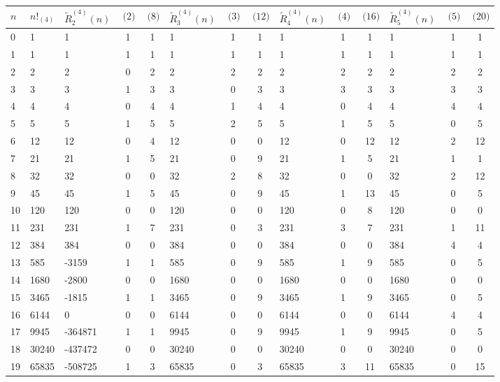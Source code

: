 \documentclass[12pt,reqno]{article}
\numberwithin{sfootnote}{section}
\newcommand{\tabletopstrut}[0]{\rule{0pt}{3ex}}
\numberwithin{equation}{section}
\theoremstyle{DefaultTheoremStyle}
\theoremstyle{definition}
\newcommand{\MultiFactorial}[2]{\ensuremath{#1!_{\left(#2\right)}}}
\begin{document}
\begin{sidewaystable} 
\centering 
\smaller 

\begin{tabular}{|l|l|lcc|lcc|lcc|lcc|} \hline 
\hline\tabletopstrut 
$n$ & $\MultiFactorial{n}{4}$ & 
$\widetilde{R}_2^{(4)}(n)$ & $\pod{2}$ & $\pod{8}$ &
$\widetilde{R}_3^{(4)}(n)$ & $\pod{3}$ & $\pod{12}$ &
$\widetilde{R}_4^{(4)}(n)$ & $\pod{4}$ & $\pod{16}$ &
$\widetilde{R}_5^{(4)}(n)$ & $\pod{5}$ & $\pod{20}$ \\ \hline 
 0 & 1 & 1 & 1 & 1 & 1 & 1 & 1 & 1 & 1 & 1 & 1 & 1 & 1 \\
 1 & 1 & 1 & 1 & 1 & 1 & 1 & 1 & 1 & 1 & 1 & 1 & 1 & 1 \\
 2 & 2 & 2 & 0 & 2 & 2 & 2 & 2 & 2 & 2 & 2 & 2 & 2 & 2 \\
 3 & 3 & 3 & 1 & 3 & 3 & 0 & 3 & 3 & 3 & 3 & 3 & 3 & 3 \\
 4 & 4 & 4 & 0 & 4 & 4 & 1 & 4 & 4 & 0 & 4 & 4 & 4 & 4 \\
 5 & 5 & 5 & 1 & 5 & 5 & 2 & 5 & 5 & 1 & 5 & 5 & 0 & 5 \\
 6 & 12 & 12 & 0 & 4 & 12 & 0 & 0 & 12 & 0 & 12 & 12 & 2 & 12 \\
 7 & 21 & 21 & 1 & 5 & 21 & 0 & 9 & 21 & 1 & 5 & 21 & 1 & 1 \\
 8 & 32 & 32 & 0 & 0 & 32 & 2 & 8 & 32 & 0 & 0 & 32 & 2 & 12 \\
 9 & 45 & 45 & 1 & 5 & 45 & 0 & 9 & 45 & 1 & 13 & 45 & 0 & 5 \\
 10 & 120 & 120 & 0 & 0 & 120 & 0 & 0 & 120 & 0 & 8 & 120 & 0 & 0 \\
 11 & 231 & 231 & 1 & 7 & 231 & 0 & 3 & 231 & 3 & 7 & 231 & 1 & 11 \\
 12 & 384 & 384 & 0 & 0 & 384 & 0 & 0 & 384 & 0 & 0 & 384 & 4 & 4 \\
 13 & 585 & -3159 & 1 & 1 & 585 & 0 & 9 & 585 & 1 & 9 & 585 & 0 & 5 \\
 14 & 1680 & -2800 & 0 & 0 & 1680 & 0 & 0 & 1680 & 0 & 0 & 1680 & 0 & 0 \\
 15 & 3465 & -1815 & 1 & 1 & 3465 & 0 & 9 & 3465 & 1 & 9 & 3465 & 0 & 5 \\
 16 & 6144 & 0 & 0 & 0 & 6144 & 0 & 0 & 6144 & 0 & 0 & 6144 & 4 & 4 \\
 17 & 9945 & -364871 & 1 & 1 & 9945 & 0 & 9 & 9945 & 1 & 9 & 9945 & 0 & 5 \\
 18 & 30240 & -437472 & 0 & 0 & 30240 & 0 & 0 & 30240 & 0 & 0 & 30240 & 0 & 0 \\
 19 & 65835 & -508725 & 1 & 3 & 65835 & 0 & 3 & 65835 & 3 & 11 & 65835 & 0 & 15 \\

\end{tabular}
\end{sidewaystable}
\end{document}

